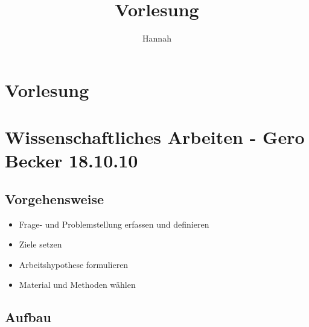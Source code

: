 \documentclass{article}
\begin{document}
\begin{titlepage}
\author{Hannah} 
\title{Vorlesung} 
\maketitle
\newpage
\tableofcontents
\end{titlepage} 

\section{Vorlesung}

\section{Wissenschaftliches Arbeiten - Gero Becker 18.10.10}
\subsection*{Vorgehensweise}
\begin{itemize}
  \item Frage- und Problemstellung erfassen und definieren
  \item Ziele setzen
  \item Arbeitshypothese formulieren
  \item Material und Methoden wählen
\end{itemize}
\subsection*{Aufbau}
\end{document}
